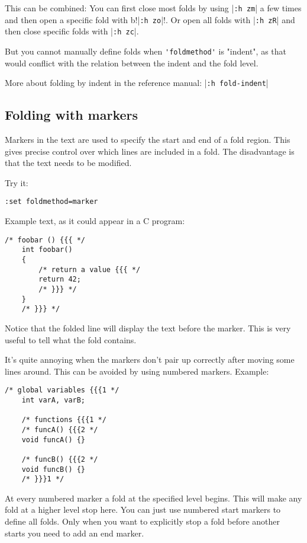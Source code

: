 This can be combined: You can first close most folds by using |\verb!:h zm!| a few times and then open a specific fold with b!|\verb!:h zo!|!.
Or open all folds with |\verb!:h zR!| and then close specific folds with |\verb!:h zc!|.

But you cannot manually define folds when \verb!'foldmethod'! is "indent", as that would conflict with the relation between the indent and the fold level.

More about folding by indent in the reference manual: |\verb!:h fold-indent!|
\subsection{Folding with markers}
Markers in the text are used to specify the start and end of a fold region.
This gives precise control over which lines are included in a fold.
The disadvantage is that the text needs to be modified.

Try it:

\begin{Verbatim}[samepage=true]
 :set foldmethod=marker
\end{Verbatim}

Example text, as it could appear in a C program:

\begin{Verbatim}[samepage=true]
    /* foobar () {{{ */
    int foobar()
    {
        /* return a value {{{ */
        return 42;
        /* }}} */
    }
    /* }}} */
\end{Verbatim}

Notice that the folded line will display the text before the marker.
This is very useful to tell what the fold contains.

It's quite annoying when the markers don't pair up correctly after moving some lines around.
This can be avoided by using numbered markers.
Example:

\begin{Verbatim}[samepage=true]
    /* global variables {{{1 */
    int varA, varB;

    /* functions {{{1 */
    /* funcA() {{{2 */
    void funcA() {}

    /* funcB() {{{2 */
    void funcB() {}
    /* }}}1 */
\end{Verbatim}

At every numbered marker a fold at the specified level begins.
This will make any fold at a higher level stop here.
You can just use numbered start markers to define all folds.
Only when you want to explicitly stop a fold before another starts you need to add an end marker.

